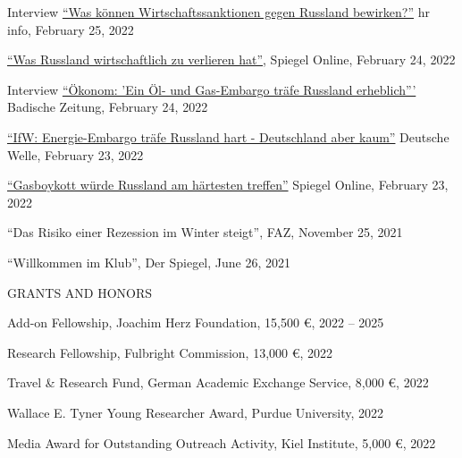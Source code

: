 \documentclass{article}
\begin{document}
\begin{minipage}[t]{0.8\textwidth}
    Interview \href{https://www.hr-inforadio.de/programm/themen/ukraine-krieg-was-koennen-wirtschaftssanktionen-gegen-russland-bewirken,ukraine-konflikt-was-koennen-sanktionen-bewirken-100.html}{``Was können Wirtschaftssanktionen gegen Russland bewirken?''} hr info, February 25, 2022 \par
    \href{https://www.spiegel.de/wirtschaft/russland-und-die-eu-was-russland-wirtschaftlich-zu-verlieren-hat-a-09eb6357-9607-45f8-bfb8-d39ef5e71b86}{``Was Russland wirtschaftlich zu verlieren hat''}, Spiegel Online, February 24, 2022 \par
    Interview \href{https://www.badische-zeitung.de/die-russland-sanktionen-sind-noch-nicht-die-ganz-grosse-keule--209731804.html}{``Ökonom: 'Ein Öl- und Gas-Embargo träfe Russland erheblich'''} Badische Zeitung, February 24, 2022 \par
    \href{https://www.dw.com/de/ifw-energie-embargo-tr\%C3\%A4fe-russland-hart-deutschland-aber-kaum/a-60885585}{``IfW: Energie-Embargo träfe Russland hart - Deutschland aber kaum''} Deutsche Welle, February 23, 2022 \par
    \href{https://www.spiegel.de/wirtschaft/unternehmen/sanktionen-wegen-ukraine-eskalation-gas-boykott-wuerde-russland-am-haertesten-treffen-a-d28dc387-1c8b-498d-9470-ef15043fac74}{``Gasboykott würde Russland am härtesten treffen''} Spiegel Online, February 23, 2022 \par
    ``Das Risiko einer Rezession im Winter steigt'', FAZ, November 25, 2021 \par
    ``Willkommen im Klub'', Der Spiegel, June 26, 2021 \par
\end{minipage}
\medskip


\begin{minipage}[t]{0.12\textwidth}
    {\selectfont GRANTS AND HONORS} \\
\end{minipage}
\hspace{5mm}
\begin{minipage}[t]{0.8\textwidth}
    Add-on Fellowship, Joachim Herz Foundation, 15,500 \euro{}, 2022 -- 2025 \par
    Research Fellowship, Fulbright Commission, 13,000 \euro{}, 2022 \par
    Travel \& Research Fund, German Academic Exchange Service, 8,000 \euro{}, 2022 \par
    Wallace E. Tyner Young Researcher Award, Purdue University, 2022 \par
    Media Award for Outstanding Outreach Activity, Kiel Institute, 5,000 \euro{}, 2022 \par
\end{minipage}
\medskip
\end{document}

